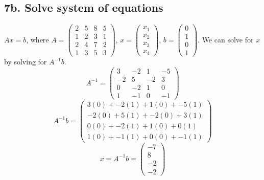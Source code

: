 \documentclass[11pt]{article}
\begin{document}
\subsection*{7b. Solve system of equations}
\(Ax = b\), where \(A = \begin{pmatrix}
                            2 & 5 & 8 & 5 \\
                            1 & 2 & 3 & 1 \\
                            2 & 4 & 7 & 2 \\
                            1 & 3 & 5 & 3
                        \end{pmatrix}\),
                    \(x = \begin{pmatrix}
                           x_1 \\
                           x_2 \\
                           x_3 \\
                           x_4 
                        \end{pmatrix}\),
                    \(b = \begin{pmatrix}
                        0 \\
                        1 \\
                        0 \\
                        1 
                     \end{pmatrix}\).\newline
We can solve for \(x\) by solving for \(A^{-1}b\).
\[
    A^{-1} =
    \begin{pmatrix}
        3 & -2 & 1 & -5 \\
        -2 & 5 & -2 & 3 \\
        0 & -2 & 1 & 0 \\
        1 & -1 & 0 & -1
    \end{pmatrix}
\]
\[
    A^{-1}b = 
    \begin{pmatrix}
        3(0) + -2(1) + 1(0) + -5(1) \\
        -2(0) + 5(1) + -2(0) + 3(1) \\
        0(0) + -2(1) + 1(0) + 0(1) \\
        1(0) + -1(1) + 0(0) + -1(1)
    \end{pmatrix}
\]
\[
    x = A^{-1}b = 
    \begin{pmatrix}
        -7 \\
        8 \\
        -2 \\
        -2
    \end{pmatrix}
\]
\end{document}
